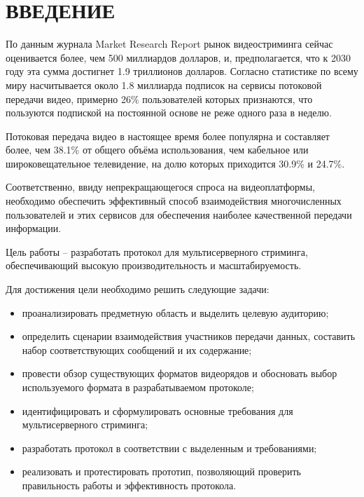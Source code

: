 \section*{ВВЕДЕНИЕ}
По данным журнала Market Research Report \cite{statistics} рынок видеостриминга сейчас оценивается более, чем 500 миллиардов долларов, и, предполагается, что к 2030 году эта сумма достигнет 1.9 триллионов долларов. Согласно статистике по всему миру насчитывается около 1.8 миллиарда подписок на сервисы потоковой передачи видео, примерно 26\% пользователей которых признаются, что пользуются подпиской на постоянной основе не реже одного раза в неделю. 

Потоковая передача видео в настоящее время более популярна и составляет более, чем 38.1\% от общего объёма использования, чем кабельное или широковещательное телевидение, на долю которых приходится 30.9\% и 24.7\%.

Соответственно, ввиду непрекращающегося спроса на видеоплатформы, необходимо обеспечить эффективный способ взаимодействия многочисленных пользователей и этих сервисов для обеспечения наиболее качественной передачи информации.

Цель работы -- разработать протокол для мультисерверного стриминга, обеспечивающий высокую производительность и масштабируемость.

Для достижения цели необходимо решить следующие задачи:
\begin{itemize}	
	\item проанализировать предметную область и выделить целевую аудиторию;
	
	\item определить сценарии взаимодействия участников передачи данных, составить набор соответствующих сообщений и их содержание;
	
	\item провести обзор существующих форматов видеорядов и обосновать выбор используемого формата в разрабатываемом протоколе;
	
	\item идентифицировать и сформулировать основные требования для мультисерверного стриминга;
	
	\item разработать протокол в соответствии с выделенным и требованиями;
	
	\item реализовать и протестировать прототип, позволяющий проверить правильность работы и эффективность протокола.
\end{itemize}

\pagebreak